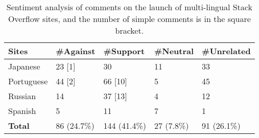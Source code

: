 \begin{table}
	\centering
	\caption{Sentiment analysis of comments on the launch of multi-lingual Stack Overflow sites, and the number of simple comments is in the square bracket.}
	\label{tab:sentiment}
	\small
	\begin{tabular}{lllll}
		\hline
		\textbf{Sites}     & \textbf{\#Against} & \textbf{\#Support}  & \textbf{\#Neutral} & \textbf{\#Unrelated} \\ \hline
		Japanese   & 23 [1] & 30      & 11 & 33  \\
        Portuguese & 44 [2] & 66 [10] & 5  & 45  \\
        Russian    & 14     & 37 [13] & 4  & 12  \\
        Spanish    & 5      & 11      & 7  & 1   \\ \hline
        \textbf{Total}    & 86 (24.7\%) & 144 (41.4\%) & 27 (7.8\%) & 91 (26.1\%) \\
		\hline
	\end{tabular}
\end{table}

